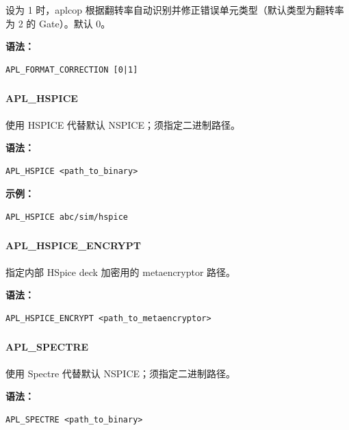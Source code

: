 设为 1 时，aplcop 根据翻转率自动识别并修正错误单元类型（默认类型为翻转率为 2 的 Gate）。默认 0。

\textbf{语法：}
\begin{lstlisting}
APL_FORMAT_CORRECTION [0|1]
\end{lstlisting}

\subsubsection{}
\paragraph*{APL_HSPICE}

使用 HSPICE 代替默认 NSPICE；须指定二进制路径。

\textbf{语法：}
\begin{lstlisting}
APL_HSPICE <path_to_binary>
\end{lstlisting}

\textbf{示例：}
\begin{lstlisting}
APL_HSPICE abc/sim/hspice
\end{lstlisting}

\subsubsection{}
\paragraph*{APL_HSPICE_ENCRYPT}

指定内部 HSpice deck 加密用的 metaencryptor 路径。

\textbf{语法：}
\begin{lstlisting}
APL_HSPICE_ENCRYPT <path_to_metaencryptor>
\end{lstlisting}

\subsubsection{}
\paragraph*{APL_SPECTRE}

使用 Spectre 代替默认 NSPICE；须指定二进制路径。

\textbf{语法：}
\begin{lstlisting}
APL_SPECTRE <path_to_binary>
\end{lstlisting}


